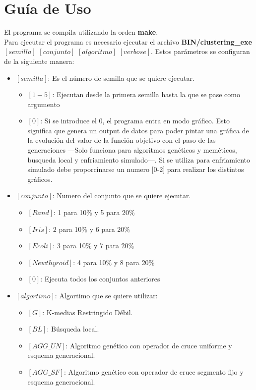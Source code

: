 \newpage
\section{Guía de Uso}
El programa se compila utilizando la orden \textbf{make}.\\
Para ejecutar el programa es necesario ejecutar el archivo \textbf{BIN/clustering\_exe} $[semilla]$ $[conjunto]$ $[algoritmo]$ $[verbose]$.
Estos parámetros se configuran de la siguiente manera:
\begin{itemize}
   \item $[semilla]$: Es el número de semilla que se quiere ejecutar.
   \begin{itemize}
      \item $[1-5]$: Ejecutan desde la primera semilla hasta la que se pase como argumento
      \item $[0]$: Si se introduce el 0, el programa entra en modo gráfico. Esto significa que genera un output de datos para poder pintar una gráfica de la evolución del valor de la función objetivo con el paso de las generaciones ---Solo funciona para algoritmos genéticos y meméticos, busqueda local y enfriamiento simulado---.
      Si se utiliza para enfriamiento simulado debe proporcinarse un numero [0-2] para realizar los distintos gráficos.
   \end{itemize}
   \item $[conjunto]$: Numero del conjunto que se quiere ejecutar.
   \begin{itemize}
      \item $[Rand]$: 1 para 10\% y 5 para 20\%
      \item $[Iris]$: 2 para 10\% y 6 para 20\%
      \item $[Ecoli]$: 3 para 10\% y 7 para 20\%
      \item $[Newthyroid]$: 4 para 10\% y 8 para 20\%
      \item $[0]$: Ejecuta todos los conjuntos anteriores
   \end{itemize}
   \item $[algortimo]$: Algortimo que se quiere utilizar:
   \begin{itemize}
      \item $[G]$: K-medias Restringido Débil.
      \item $[BL]$: Búsqueda local.
      \item $[AGG\_UN]$: Algoritmo genético con operador de cruce uniforme y esquema generacional.
      \item $[AGG\_SF]$: Algoritmo genético con operador de cruce segmento fijo y esquema generacional.

\end{itemize}
\end{itemize}
